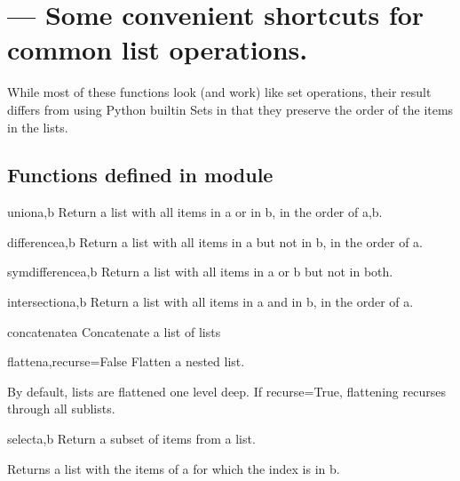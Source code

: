 

\section{ --- Some convenient shortcuts for common list operations.}
\label{sec:olist}


While most of these functions look (and work) like set operations, their
result differs from using Python builtin Sets in that they preserve the
order of the items in the lists.


\subsection{Functions defined in module }

\begin{funcdesc}{union}{a,b}
Return a list with all items in a or in b, in the order of a,b.
\end{funcdesc}

\begin{funcdesc}{difference}{a,b}
Return a list with all items in a but not in b, in the order of a.
\end{funcdesc}

\begin{funcdesc}{symdifference}{a,b}
Return a list with all items in a or b but not in both.
\end{funcdesc}

\begin{funcdesc}{intersection}{a,b}
Return a list with all items in a and  in b, in the order of a.
\end{funcdesc}

\begin{funcdesc}{concatenate}{a}
Concatenate a list of lists
\end{funcdesc}

\begin{funcdesc}{flatten}{a,recurse=False}
Flatten a nested list.

    By default, lists are flattened one level deep.
    If recurse=True, flattening recurses through all sublists.
    
\end{funcdesc}

\begin{funcdesc}{select}{a,b}
Return a subset of items from a list.

    Returns a list with the items of a for which the index is in b.
    
\end{funcdesc}


